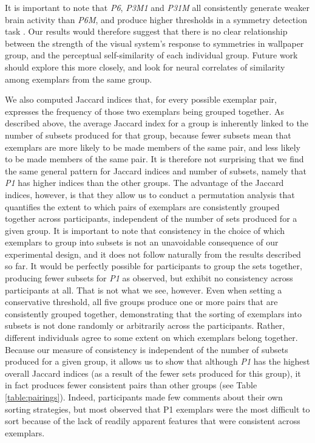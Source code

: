 \documentclass[11pt, twoside]{article}
\begin{document}
It is important to note that \textit{P6}, \textit{P3M1} and \textit{P31M} all consistently generate weaker brain activity than \textit{P6M}, and produce higher thresholds in a symmetry detection task \citep{kohler_clarke_2021}. Our results would therefore suggest that there is no clear relationship between the strength of the visual system's response to symmetries in wallpaper group, and the perceptual self-similarity of each individual group. Future work should explore this more closely, and look for neural correlates of similarity among exemplars from the same group.

We also computed Jaccard indices that, for every possible exemplar pair, expresses the frequency of those two exemplars being grouped together. As described above, the average Jaccard index for a group is inherently linked to the number of subsets produced for that group, because fewer subsets mean that exemplars are more likely to be made members of the same pair, and less likely to be made members of the same pair. It is therefore not surprising that we find the same general pattern for Jaccard indices and number of subsets, namely that \textit{P1} has higher indices than the other groups. The advantage of the Jaccard indices, however, is that they allow us to conduct a permutation analysis that quantifies the extent to which pairs of exemplars are consistently grouped together across participants, independent of the number of sets produced for a given group. It is important to note that consistency in the choice of which exemplars to group into subsets is not an unavoidable consequence of our experimental design, and it does not follow naturally from the results described so far. It would be perfectly possible for participants to group the sets together, producing fewer subsets for \textit{P1} as observed, but exhibit no consistency across participants at all. That is not what we see, however. Even when setting a conservative threshold, all five groups produce one or more pairs that are consistently grouped together, demonstrating that the sorting of exemplars into subsets is not done randomly or arbitrarily across the participants. Rather, different individuals agree to some extent on which exemplars belong together. Because our measure of consistency is independent of the number of subsets produced for a given group, it allows us to show that although \textit{P1} has the highest overall Jaccard indices (as a result of the fewer sets produced for this group), it in fact produces fewer consistent pairs than other groups (see Table \ref{table:pairings}). Indeed, participants made few comments about their own sorting strategies, but most observed that P1 exemplars were the most difficult to sort because of the lack of readily apparent features that were consistent across exemplars.
\end{document}
